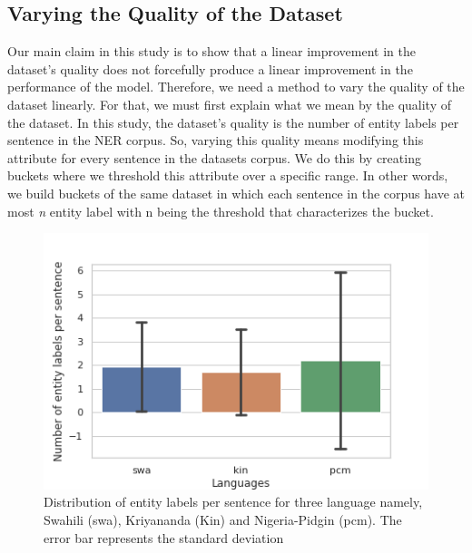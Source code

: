 \documentclass{article}
\begin{document}

\subsection{Varying the Quality of the Dataset}
\label{sec:exp:var}
Our main claim in this study is to show that a linear improvement in the dataset's quality does not forcefully produce a linear improvement in the performance of the model. Therefore, we need a method to vary the quality of the dataset linearly. For that, we must first explain what we mean by the quality of the dataset. In this study, the dataset's quality is the number of entity labels per sentence in the NER corpus. So, varying this quality means modifying this attribute for every sentence in the datasets corpus. We do this by creating buckets where we threshold this attribute over a specific range. In other words, we build buckets of the same dataset in which each sentence in the corpus have at most \textit{n} entity label with n being the threshold that characterizes the bucket.

\begin{figure}
    \centering
    \includegraphics[width=\columnwidth]{images/dist_plot.png}
    \caption{Distribution of entity labels per sentence for three language namely, Swahili (swa), Kriyananda (Kin) and Nigeria-Pidgin (pcm). The error bar represents the standard deviation}
    \label{fig:dist} 
\end{figure}
\end{document}
